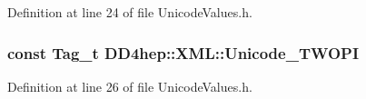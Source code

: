 Definition at line 24 of file UnicodeValues.h.\hypertarget{namespace_d_d4hep_1_1_x_m_l_a1e1966450a7f5238c27afa75f9e8ac8c}{
\subsubsection[{Unicode\_\-TWOPI}]{\setlength{\rightskip}{0pt plus 5cm}const {\bf Tag\_\-t} {\bf DD4hep::XML::Unicode\_\-TWOPI}}}
\label{namespace_d_d4hep_1_1_x_m_l_a1e1966450a7f5238c27afa75f9e8ac8c}


Definition at line 26 of file UnicodeValues.h.